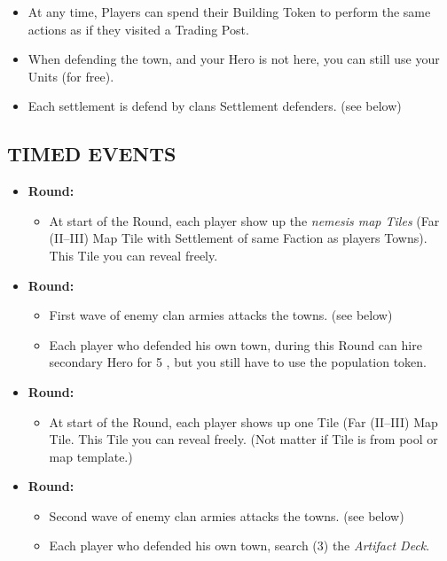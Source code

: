 \begin{multicols}{2}
\begin{itemize}
  \item At any time, Players can spend their Building Token to perform the same actions as if they visited a Trading Post.
  \item When defending the town, and your Hero is not here, you can still use your Units (for free).
  \item Each settlement is defend by clans Settlement defenders. (see below)
\end{itemize}

\subsection*{\MakeUppercase{Timed Events}}
  \begin{itemize}
   \item \textbf{ Round:}
    \begin{itemize}
      \item At start of the Round, each player show up the \textit{nemesis map Tiles} (Far (II--III) Map Tile with Settlement of same Faction as players Towns). This Tile you can reveal freely.
    \end{itemize}
   \item \textbf{ Round:}
    \begin{itemize}
      \item  First wave of enemy clan armies attacks the towns. (see below)
      \item  Each player who defended his own town, during this Round can hire secondary Hero for 5 , but you still have to use the population token.
    \end{itemize}
   \item \textbf{ Round:}
    \begin{itemize}
      \item At start of the Round, each player shows up one Tile (Far (II--III) Map Tile. This Tile you can reveal freely. (Not matter if Tile is from pool or map template.)
    \end{itemize}
   \item \textbf{ Round:}
    \begin{itemize}
      \item Second wave of enemy clan armies attacks the towns. (see below)
      \item Each player who defended his own town, search (3) the \textit{Artifact Deck}.
     \end{itemize}

\end{itemize}
\end{multicols}
